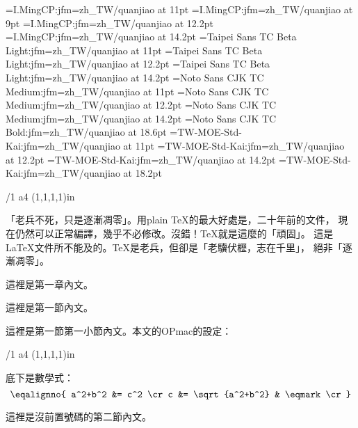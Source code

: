 
\jfont\ming={I.MingCP:jfm=zh_TW/quanjiao} at 11pt
\jfont\mings={I.MingCP:jfm=zh_TW/quanjiao} at 9pt
\jfont\mingl={I.MingCP:jfm=zh_TW/quanjiao} at 12.2pt
\jfont\mingL={I.MingCP:jfm=zh_TW/quanjiao} at 14.2pt
\jfont\hei={Taipei Sans TC Beta Light:jfm=zh_TW/quanjiao} at 11pt
\jfont\heil={Taipei Sans TC Beta Light:jfm=zh_TW/quanjiao} at 12.2pt
\jfont\heiL={Taipei Sans TC Beta Light:jfm=zh_TW/quanjiao} at 14.2pt
\jfont\heib={Noto Sans CJK TC Medium:jfm=zh_TW/quanjiao} at 11pt
\jfont\heibl={Noto Sans CJK TC Medium:jfm=zh_TW/quanjiao} at 12.2pt
\jfont\heibL={Noto Sans CJK TC Medium:jfm=zh_TW/quanjiao} at 14.2pt
\jfont\heibh={Noto Sans CJK TC Bold:jfm=zh_TW/quanjiao} at 18.6pt
\jfont\kai={TW-MOE-Std-Kai:jfm=zh_TW/quanjiao} at 11pt
\jfont\kail={TW-MOE-Std-Kai:jfm=zh_TW/quanjiao} at 12.2pt
\jfont\kaiL={TW-MOE-Std-Kai:jfm=zh_TW/quanjiao} at 14.2pt
\jfont\kaih={TW-MOE-Std-Kai:jfm=zh_TW/quanjiao} at 18.2pt


\margins/1 a4 (1,1,1,1)in  %
\typosize[11/16.4]

\hyperlinks{\Blue}{\Green}
 

\ming



\nonum\notoc{}
\maketoc

\nonum {}

「老兵不死，只是逐漸凋零」。用plain \TeX{}的最大好處是，二十年前的文件，
現在仍然可以正常編譯，幾乎不必修改。沒錯！\TeX{}就是這麼的「頑固」。
這是\LaTeX{}文件所不能及的。\TeX{}是老兵，但卻是「老驥伏櫪，志在千里」，
絕非「逐漸凋零」。


這裡是第一章內文。


這裡是第一節內文。


這裡是第一節第一小節內文。本文的OPmac的設定：

\typosize[11/12.5]
\begtt

\margins/1 a4 (1,1,1,1)in  %
\typosize[11/16.4]
\endtt

底下是數學式：
$$\eqalignno{
    a^2+b^2 &= c^2 \cr
          c &= \sqrt{a^2+b^2} & \eqmark \cr}$$

\typosize[11/16.4]
\nonum {}

這裡是沒前置號碼的第二節內文。

\bye

